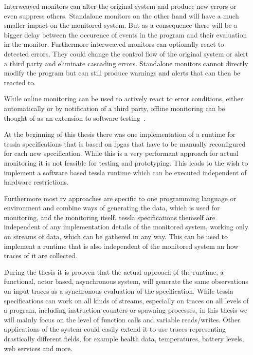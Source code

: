 Interweaved monitors can alter the original system and produce new errors or even suppress others.
Standalone monitors on the other hand will have a much smaller impact on the monitored system.
But as a consequence there will be a bigger delay between the occurence of events in the program and their evaluation in the monitor.
Furthermore interweaved monitors can optionally react to detected errors.
They could change the control flow of the original system or alert a third party and eliminate cascading errors.
Standalone monitors cannot directly modify the program but can still produce warnings and alerts that can then be reacted to.

While online monitoring can be used to actively react to error conditions, either automatically or by notification of a third party, offline monitoring can be thought of as an extension to software testing~\cite{DAngelo2005}.

At the beginning of this thesis there was one implementation of a runtime for \gls{tessla} specifications that is based on \glspl{fpga} that have to be manually reconfigured for each new specification.
While this is a very performant approach for actual monitoring it is not feasible for testing and prototyping.
This leads to the wish to implement a software based \gls{tessla} runtime which can be executed independent of hardware restrictions.

Furthermore most \gls{rv} approaches are specific to one programming language or environment and combine ways of generating the data, which is used for monitoring, and the monitoring itself.
\gls{tessla} specifications themself are independent of any implementation details of the monitored system, working only on streams of data, which can be gathered in any way.
This can be used to implement a runtime that is also independent of the monitored system an how traces of it are collected.

During the thesis it is prooven that the actual approach of the runtime, a functional, actor based, asynchronous system, will generate the same observations on input traces as a synchronous evaluation of the specification.
While \gls{tessla} specifications can work on all kinds of streams, especially on traces on all levels of a program, including instruction counters or spawning processes, in this thesis we will mainly focus on the level of function calls and variable reads/writes.
Other applications of the system could easily extend it to use traces representing drastically different fields, for example health data, temperatures, battery levels, web services and more.

